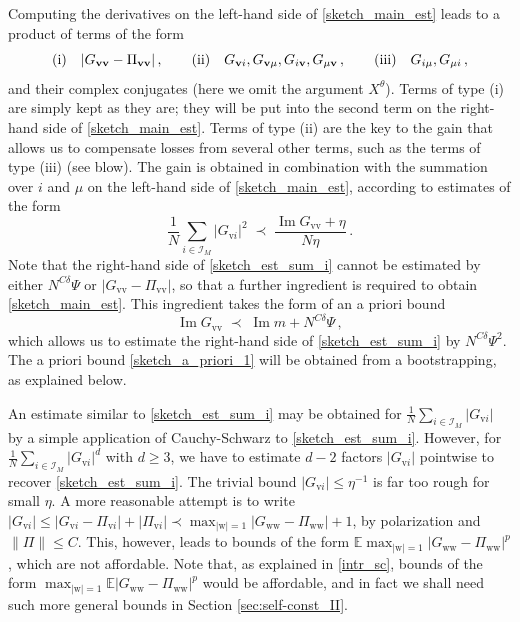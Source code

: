 \documentclass[11pt]{article} %
\numberwithin{equation}{section}
\numberwithin{figure}{section}
\theoremstyle{plain} %
\theoremstyle{definition} %
\newcommand{\f}[1]{\boldsymbol{\mathrm{#1}}} %
\renewcommand{\cal}{\mathcal}
\newcommand{\txt}[1]{\text{\rm{#1}}}
\newcommand{\E}{\mathbb{E}}
\renewcommand{\leq}{\leqslant}
\renewcommand{\geq}{\geqslant}
\newcommand{\abs}[1]{\lvert #1 \rvert}
\newcommand{\norm}[1]{\lVert #1 \rVert}
\DeclareMathOperator{\im}{Im}
\begin{document}
Computing the derivatives on the left-hand side of \eqref{sketch_main_est} leads to a product of terms of the form
\begin{equation}
\txt{(i)} \quad \abs{G_{\f v \f v} - \Pi_{\f v \f v}}\,, \qquad
\txt{(ii)} \quad G_{\f v i}, G_{\f v \mu}, G_{i \f v}, G_{\mu \f v}\,, \qquad
\txt{(iii)} \quad G_{i \mu}, G_{\mu i}\,,
\end{equation}
and their complex conjugates
(here we omit the argument $X^\theta$).
Terms of type (i) are simply kept as they are; they will be put into the second term on the right-hand side of \eqref{sketch_main_est}. Terms of type (ii) are the key to the gain that allows us to compensate losses from several other terms, such as the terms of type (iii) (see blow). The gain is obtained in combination with the summation over $i$ and $\mu$ on the left-hand side of \eqref{sketch_main_est}, according to estimates of the form
\begin{equation} \label{sketch_est_sum_i}
\frac{1}{N} \sum_{i \in \cal I_M} \abs{G_{\f v i}}^2 \;\prec\; \frac{\im G_{\f v \f v} + \eta}{N \eta}\,.
\end{equation}
Note that the right-hand side of \eqref{sketch_est_sum_i} cannot be estimated by either $N^{C \delta}\Psi$ or $\abs{G_{\f v \f v} - \Pi_{\f v \f v}}$, so that a further ingredient is required to obtain \eqref{sketch_main_est}. This ingredient takes the form of an a priori bound
\begin{equation} \label{sketch_a_priori_1}
\im G_{\f v \f v} \;\prec\; \im m + N^{C \delta} \Psi\,,
\end{equation}
which allows us to estimate the right-hand side of \eqref{sketch_est_sum_i} by $N^{C \delta} \Psi^2$. The a priori bound \eqref{sketch_a_priori_1} will be obtained from a bootstrapping, as explained below.

An estimate similar to \eqref{sketch_est_sum_i} may be obtained for $\frac{1}{N} \sum_{i \in \cal I_M} \abs{G_{\f v i}}$ by a simple application of Cauchy-Schwarz to \eqref{sketch_est_sum_i}. However, for $\frac{1}{N} \sum_{i \in \cal I_M} \abs{G_{\f v i}}^d$ with $d \geq 3$, we have to estimate $d - 2$ factors $\abs{G_{\f v i}}$ pointwise to recover \eqref{sketch_est_sum_i}. The trivial bound $\abs{G_{\f vi}} \leq \eta^{-1}$ is far too rough for small $\eta$. A more reasonable attempt is to write $\abs{G_{\f v i}} \leq \abs{G_{\f v i} - \Pi_{\f v i}} + \abs{\Pi_{\f v i}} \prec \max_{\abs{\f w} = 1} \abs{G_{\f w \f w} - \Pi_{\f w \f w}} + 1$, by polarization and $\norm{\Pi} \leq C$. This, however, leads to bounds of the form $\E \max_{\abs{\f w} = 1} \abs{G_{\f w \f w} - \Pi_{\f w \f w}}^p$, which are not affordable. Note that, as explained in \eqref{intr_sc}, bounds of the form $\max_{\abs{\f w} = 1} \E \abs{G_{\f w \f w} - \Pi_{\f w \f w}}^p$ would be affordable, and in fact we shall need such more general bounds in Section \ref{sec:self-const_II}.
\end{document}

